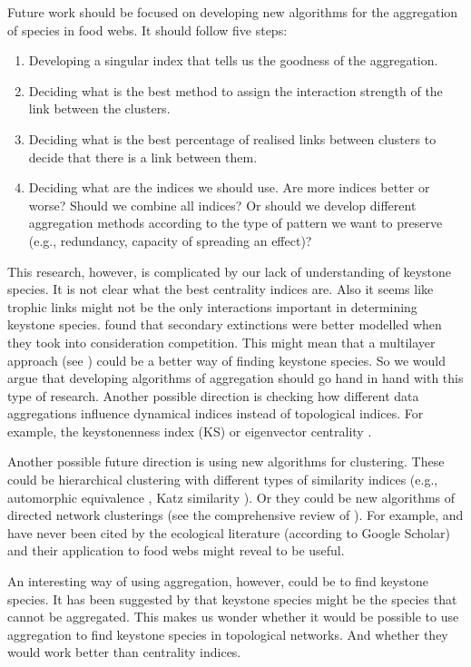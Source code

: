\documentclass[twocolumn]{article}
\begin{document}
	Future work should be focused on developing new algorithms for the aggregation of species in food webs. It should follow five steps:
		\begin{enumerate}
			\item Developing a singular index that tells us the goodness of the aggregation.
			\item Deciding what is the best method to assign the interaction strength of the link between the clusters.
			\item Deciding what is the best percentage of realised links between clusters to decide that there is a link between them.
			\item Deciding what are the indices we should use. Are more indices better or worse? Should we combine all indices? Or should we develop different aggregation methods according to the type of pattern we want to preserve (e.g., redundancy, capacity of spreading an effect)?
		\end{enumerate}
	This research, however, is complicated by our lack of understanding of keystone species. It is not clear what the best centrality indices are. Also it seems like trophic links might not be the only interactions important in determining keystone species.	\citet{Donohue2017} found that secondary extinctions were better modelled when they took into consideration competition.	This might mean that a multilayer approach (see \citet{Pilosof2017}) could be a better way of finding keystone species.	So we would argue that developing algorithms of aggregation should go hand in hand with this type of research. Another possible direction is checking how different data aggregations influence dynamical indices instead of topological indices. For example, the keystonenness index (KS) \citep{Libralato2006} or eigenvector centrality \citep{Allesina2009}.

	Another possible future direction is using new algorithms for clustering.	These could be hierarchical clustering with different types of similarity indices (e.g., automorphic equivalence \citep{Wasserman1994}, Katz similarity \citep{Newman2018}). Or they could be new algorithms of directed network clusterings (see the comprehensive review of \citet{Malliaros2013}). For example, \citet{Zhou2005,Huang2006,Wang2008,Kim2010} and \citet{Zhan2011} have never been cited by the ecological literature (according to Google Scholar) and their application to food webs might reveal to be useful.

	An interesting way of using aggregation, however, could be to find keystone species.
	It has been suggested by \citep{Bond1994} that keystone species might be the species that cannot be aggregated.
	This makes us wonder whether it would be possible to use aggregation to find keystone species in topological networks.
	And whether they would work better than centrality indices.
\end{document}
